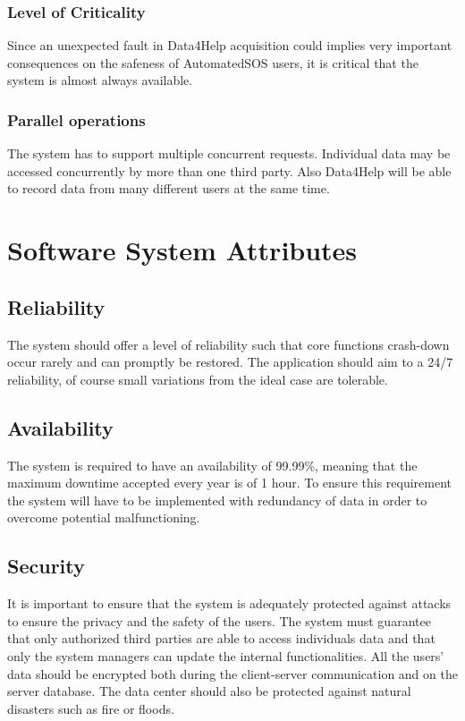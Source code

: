 \subsubsection{Level of Criticality}
Since an unexpected fault in Data4Help acquisition could implies very important consequences on the safeness of AutomatedSOS users, it is critical that the system is almost always available.

\subsubsection {Parallel operations}
The system has to support multiple concurrent requests. Individual data may be accessed concurrently by more than one third party. Also Data4Help will be able to record data from many different users at the same time.

\section{Software System Attributes}
\subsection{Reliability}
The system should offer a level of reliability such that core functions crash-down occur rarely and can promptly be restored.
The application should aim to a 24/7 reliability, of course small variations from the ideal case are tolerable. 

\subsection{Availability}
The system is required to have an availability of 99.99\%, meaning that the maximum downtime accepted every year is of 1 hour. To ensure this requirement the system will have to be implemented with redundancy of data in order to overcome potential malfunctioning.

\subsection{Security}
It is important to ensure that the system is adequately protected against attacks to ensure the privacy and the safety of the users.
The system must guarantee that only authorized third parties are able to access individuals data and that only the system managers can update the internal functionalities.
All the users' data should be encrypted both during the client-server communication and on the server database.
The data center should also be protected against natural disasters such as fire or floods. 

